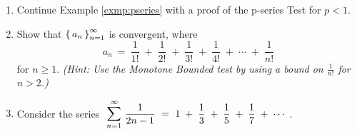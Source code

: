 {\begin{enumerate}[\bfseries 1.]
\par\noindent For Exercises 18-21 determine whether the given series is
convergent. If convergent then find its sum.
[{[\bfseries 1.]}]
[{[\bfseries 1.]}]
 \item Continue Example \ref{exmp:pseries} with a proof of the p-series Test for
  $p < 1$.
 \item Show that $\left\lbrace\mspace{3mu}a_n\mspace{3mu}\right\rbrace_{n=1}^{\infty}$ is convergent, where
\[
a_n ~=~ \frac{1}{1!} \;+\; \frac{1}{2!} \;+\; \frac{1}{3!} \;+\; \frac{1}{4!} \;+\;
\cdots \;+\; \frac{1}{n!}
\]
for $n \ge 1$. \emph{(Hint: Use the Monotone Bounded test by using a bound on
$\frac{1}{n!}$ for $n > 2$.)}
 \item Consider the series $~\bigsum{n = 1}{\infty}~ \dfrac{1}{2n-1} ~=~
1 \;+\; \frac{1}{3} \;+\; \frac{1}{5} \;+\; \frac{1}{7} \;+\; \dotsb ~$.
\begin{enumerate}[\bfseries (a)]

\end{enumerate}
\end{enumerate}}
